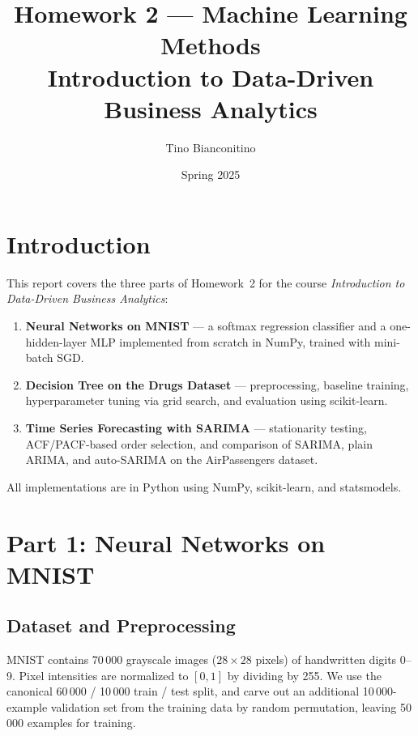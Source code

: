 \documentclass[12pt,a4paper]{article}
\title{\textbf{Homework 2 --- Machine Learning Methods}\\[0.4em]
       \large Introduction to Data-Driven Business Analytics}
\author{Tino Bianconitino}
\date{Spring 2025}
\begin{document}
\maketitle
\tableofcontents
\newpage

\section{Introduction}

This report covers the three parts of Homework~2 for the course
\textit{Introduction to Data-Driven Business Analytics}:

\begin{enumerate}
  \item \textbf{Neural Networks on MNIST} --- a softmax regression classifier
        and a one-hidden-layer MLP implemented from scratch in NumPy, trained
        with mini-batch SGD.
  \item \textbf{Decision Tree on the Drugs Dataset} --- preprocessing,
        baseline training, hyperparameter tuning via grid search, and evaluation
        using scikit-learn.
  \item \textbf{Time Series Forecasting with SARIMA} --- stationarity testing,
        ACF/PACF-based order selection, and comparison of SARIMA, plain ARIMA,
        and auto-SARIMA on the AirPassengers dataset.
\end{enumerate}

All implementations are in Python using NumPy, scikit-learn, and statsmodels.

\section{Part 1: Neural Networks on MNIST}

\subsection{Dataset and Preprocessing}

MNIST contains 70\,000 grayscale images ($28\times28$ pixels) of handwritten
digits 0--9.  Pixel intensities are normalized to $[0,1]$ by dividing by 255.
We use the canonical 60\,000 / 10\,000 train / test split, and carve out an
additional 10\,000-example validation set from the training data by random
permutation, leaving 50\,000 examples for training.
\end{document}
